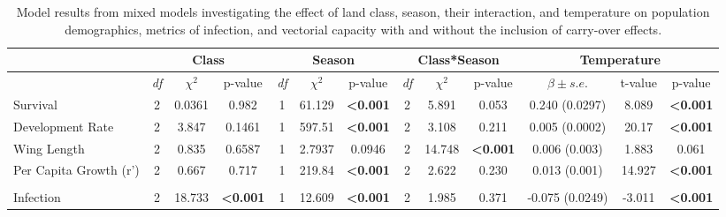 \documentclass[12pt]{article}
\begin{document}
\begin{landscape}
\begin{table}[]
\centering
\caption{Model results from mixed models investigating the effect of land class, season, their interaction, and temperature on population demographics, metrics of infection, and vectorial capacity with and without the inclusion of carry-over effects.}
\label{table:modelResults}
\begin{tabular}{l|ccc|ccc|ccc|ccc}
                                  & \multicolumn{3}{c}{\textbf{Class}}             & \multicolumn{3}{c}{\textbf{Season}}            & \multicolumn{3}{c}{\textbf{Class*Season}}      & \multicolumn{3}{c}{\textbf{Temperature}}             \\
\hline
                                  & \textit{df} & $\chi^2$  & p-value                 & \textit{df} & $\chi^2$  & p-value                 & \textit{df} & $\chi^2$  & p-value                 & $\beta \pm s.e.$          & t-value & p-value                 \\
\hline
Survival                    & 2           & 0.0361    & 0.982                   & 1           & 61.129    & \textbf{\textless0.001} & 2           & 5.891     & 0.053                   & 0.240 (0.0297)   & 8.089   & \textbf{\textless0.001} \\
Development Rate            & 2           & 3.847     & 0.1461                  & 1           & 597.51    & \textbf{\textless0.001} & 2           & 3.108     & 0.211                   & 0.005 (0.0002)   & 20.17   & \textbf{\textless0.001} \\
Wing Length                 & 2           & 0.835     & 0.6587                  & 1           & 2.7937    & 0.0946                  & 2           & 14.748    & \textbf{\textless0.001} & 0.006 (0.003)    & 1.883   & 0.061                   \\
Per Capita Growth (r')      & 2           & 0.667     & 0.717                   & 1           & 219.84    & \textbf{\textless0.001} & 2           & 2.622     & 0.230                   & 0.013 (0.001)    & 14.927  & \textbf{\textless0.001}  \\
                            &             &           &                         &             &           &                         &             &           &                         &                  &         &                         \\
Infection                   & 2           & 18.733    & \textbf{\textless0.001} & 1           & 12.609    & \textbf{\textless0.001} & 2           & 1.985     & 0.371                   & -0.075 (0.0249)  & -3.011  & \textbf{\textless0.001} \\

\end{tabular}
\end{table}
\end{landscape}
\end{document}
